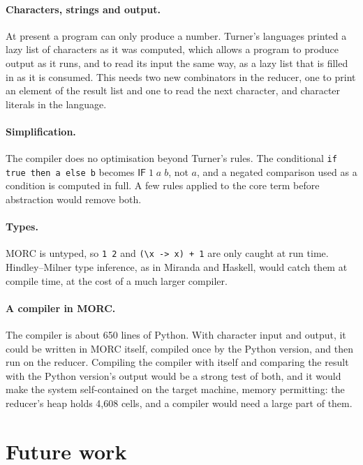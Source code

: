\documentclass[11pt,a4paper]{article}
\newcommand{\cmb}[1]{\textsf{#1}}
\newcommand{\IF}{\cmb{IF}}
\theoremstyle{definition}
\theoremstyle{plain}
\begin{document}
\paragraph{Characters, strings and output.} At present a program can only
produce a number. Turner's languages printed a lazy list of characters as it
was computed, which allows a program to produce output as it runs, and to
read its input the same way, as a lazy list that is filled in as it is
consumed. This needs two new combinators in the reducer, one to print an
element of the result list and one to read the next character, and
character literals in the language.

\paragraph{Simplification.} The compiler does no optimisation beyond Turner's
rules. The conditional \verb|if true then a else b| becomes $\IF\;1\;a\;b$,
not $a$, and a negated comparison used as a condition is computed in full. A
few rules applied to the core term before abstraction would remove both.

\paragraph{Types.} MORC is untyped, so \verb|1 2| and \verb|(\x -> x) + 1|
are only caught at run time. Hindley--Milner type inference, as in Miranda
and Haskell, would catch them at compile time, at the cost of a much larger
compiler.

\paragraph{A compiler in MORC.} The compiler is about 650 lines of Python.
With character input and output, it could be written in MORC itself,
compiled once by the Python version, and then run on the reducer. Compiling
the compiler with itself and comparing the result with the Python version's
output would be a strong test of both, and it would make the system
self-contained on the target machine, memory permitting: the reducer's heap
holds 4,608 cells, and a compiler would need a large part of them.

\section{Future work}\label{sec:future}
\end{document}
